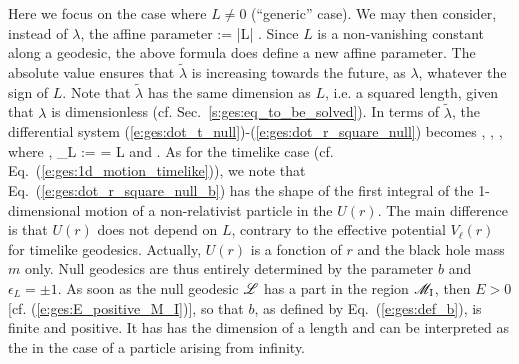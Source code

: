 Here we focus on the case where $L\not= 0$ (``generic'' case). We may then
consider, instead of $\lambda$, the affine parameter
\be
    \tilde{\lambda} := |L| \lambda .
\ee
Since $L$ is a non-vanishing constant along a geodesic, the above formula
does define a new affine parameter. The absolute value ensures that
$\tilde{\lambda}$ is increasing towards the future, as $\lambda$, whatever
the sign of $L$. Note that $\tilde{\lambda}$ has the same
dimension as $L$, i.e. a squared length, given that $\lambda$ is dimensionless
(cf. Sec.~\ref{s:ges:eq_to_be_solved}).
In terms of $\tilde{\lambda}$,
the differential system (\ref{e:ges:dot_t_null})-(\ref{e:ges:dot_r_square_null})
becomes
\be \label{e:ges:dot_t_null_b}
   ,
\ee
\be \label{e:ges:dot_ph_null_b}
    ,
\ee
\be \label{e:ges:dot_r_square_null_b}
   ,
\ee
where
\be \label{e:ges:def_b}
     ,
\ee
\be \label{e:gis:def_epsilon_L}
    \epsilon_L :=  =  L
\ee
and
\be \label{e:ges:eff_pot_null}
    .
\ee
As for the timelike case (cf. Eq.~(\ref{e:ges:1d_motion_timelike})),
we note that Eq.~(\ref{e:ges:dot_r_square_null_b})
has the shape of the first integral of the
1-dimensional motion of a non-relativist particle in the
$U(r)$. The main difference is that $U(r)$ does not depend on $L$, contrary
to the effective potential $V_\ell(r)$ for timelike geodesics. Actually,
$U(r)$ is a fonction of $r$ and the black hole mass $m$ only.
Null geodesics are thus entirely determined by the parameter
$b$ and $\epsilon_L = \pm 1$.
As soon as the null geodesic $\mathscr{L}$ has a part in the
region $\mathscr{M}_{\rm I}$, then $E>0$ [cf. (\ref{e:ges:E_positive_M_I})], so that
$b$, as defined by Eq.~(\ref{e:ges:def_b}), is finite and positive. It has
has the dimension of a length
and can be interpreted as the
 in the case of a
particle arising from infinity.

